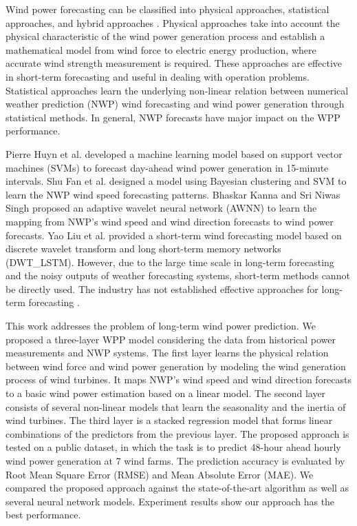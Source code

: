 \documentclass[conference]{IEEEtran}
\begin{document}
Wind power forecasting can be classified into physical approaches, statistical approaches, and hybrid approaches \cite{LI201356,Gao2016DistributedMF,Alencar17}. Physical approaches take into account the physical characteristic of the wind power generation process and establish a mathematical model from wind force to electric energy production, where accurate wind strength measurement is required. These approaches are effective in short-term forecasting and useful in dealing with operation problems. Statistical approaches learn the underlying non-linear relation between numerical weather prediction (NWP) wind forecasting and wind power generation through statistical methods. In general, NWP forecasts have major impact on the WPP performance.

Pierre Huyn et al. \cite{Pierre17} developed a machine learning model based on support vector machines (SVMs) to forecast day-ahead wind power generation in 15-minute intervals. Shu Fan et al. \cite{4757294} designed a model using Bayesian clustering and SVM to learn the NWP wind speed forecasting patterns. Bhaskar Kanna and Sri Niwas Singh \cite{7894735} proposed an adaptive wavelet neural network (AWNN) to learn the mapping from NWP’s wind speed and wind direction forecasts to wind power forecasts. Yao Liu et al. \cite{app9061108} provided a short-term wind forecasting model based on discrete wavelet transform and long short-term memory networks (DWT\_LSTM). However, due to the large time scale in long-term forecasting and the noisy outputs of weather forecasting systems, short-term methods cannot be directly used. The industry has not established effective approaches for long-term forecasting \cite{HAN2019181}.

This work addresses the problem of long-term wind power prediction. We proposed a three-layer WPP model considering the data from historical power measurements and NWP systems. The first layer learns the physical relation between wind force and wind power generation by modeling the wind generation process of wind turbines. It maps NWP’s wind speed and wind direction forecasts to a basic wind power estimation based on a linear model. The second layer consists of several non-linear models that learn the seasonality and the inertia of wind turbines. The third layer is a stacked regression model that forms linear combinations of the predictors from the previous layer. The proposed approach is tested on a public dataset, in which the task is to predict 48-hour ahead hourly wind power generation at 7 wind farms. The prediction accuracy is evaluated by Root Mean Square Error (RMSE) and Mean Absolute Error (MAE). We compared the proposed approach against the state-of-the-art algorithm as well as several neural network models. Experiment results show our approach has the best performance.
\end{document}
